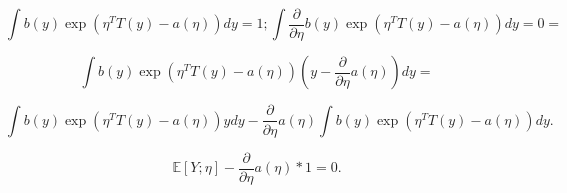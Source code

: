 \begin{answer}

\begin{equation*}
\int b(y)\exp(\eta^TT(y) - a(\eta)) dy = 1;
\int \frac{\partial}{\partial \eta}  b(y)\exp(\eta^TT(y) - a(\eta)) dy = 0 = 
\end{equation*}

\begin{equation*}
\int b(y)\exp(\eta^TT(y) - a(\eta))(y - \frac{\partial}{\partial\eta}a(\eta)) dy = 
\end{equation*}

\begin{equation*}
\int b(y)\exp(\eta^TT(y) - a(\eta))ydy - \frac{\partial}{\partial\eta}a(\eta) \int b(y)\exp(\eta^TT(y) - a(\eta))dy.
\end{equation*}

\begin{equation*}
\mathbb{E}[Y; \eta]  - \frac{\partial}{\partial\eta}a(\eta) * 1 = 0.
\end{equation*}



\end{answer}
